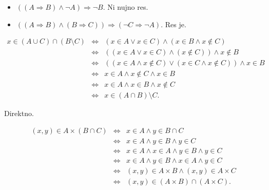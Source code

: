\begin{answer}{1.27}
\begin{itemize}
\item $((A\Rightarrow B) \wedge \neg A) \Rightarrow \neg B$. Ni nujno res.
    \item $((A\Rightarrow B) \wedge (B\Rightarrow C)) \Rightarrow (\neg C \Rightarrow \neg A)$. Res je.
\end{itemize}


\end{answer}
\begin{answer}{2.3}
\begin{eqnarray*}
x\in (A\cup C)\cap (B\setminus C) &\Leftrightarrow & (x\in A \vee x\in C) \wedge (x\in B \wedge x\notin C)\\
 &\Leftrightarrow & ((x\in A \vee x\in C) \wedge (x\notin C))\wedge x\notin B\\
&\Leftrightarrow & ((x\in A \wedge x\notin C) \vee (x\in C \wedge x\notin C)) \wedge
 x\in B\\
&\Leftrightarrow & x\in A \wedge x\notin C  \wedge x\in B\\
&\Leftrightarrow & x\in A \wedge x\in B  \wedge x\notin C \\
&\Leftrightarrow & x \in (A\cap B)\setminus C.
\end{eqnarray*}
\end{answer}
\begin{answer}{2.4}
    Direktno.
\end{answer}
\begin{answer}{2.6}
\begin{eqnarray*}
(x,y)\in A\times (B\cap C) &\Leftrightarrow & x \in A \wedge y\in B\cap C\\
&\Leftrightarrow & x \in A \wedge y\in B  \wedge y\in C\\
&\Leftrightarrow & x \in A \wedge x \in A\wedge y\in B  \wedge y\in C\\
&\Leftrightarrow & x \in A \wedge  y\in B  \wedge x \in A\wedge y\in C\\
&\Leftrightarrow & (x,y) \in A\times B \wedge  (x,y) \in A\times C\\
&\Leftrightarrow & (x,y) \in (A\times B)\cap   (A\times C).
\end{eqnarray*}
\end{answer}
